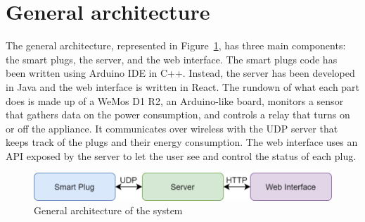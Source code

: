 \documentclass[conference]{IEEEtran}
\begin{document}
	\section{General architecture}
	The general architecture, represented in Figure~\ref{fig:architecture_schema}, has three main components: the
	smart plugs, the server, and the web interface. The smart
	plugs code has been written using Arduino IDE in C++.
	Instead, the server has been developed in Java and the web
	interface is written in React. The rundown of what each part
	does is made up of a WeMos D1 R2, an Arduino-like board,
	monitors a sensor that gathers data on the power consumption,
	and controls a relay that turns on or off the appliance. It
	communicates over wireless with the UDP server that keeps
	track of the plugs and their energy consumption. The web
	interface uses an API exposed by the server to let the user see
	and control the status of each plug.
	\begin{figure}[htbp]
		\centering
		\includegraphics[width=\linewidth]{assets/architecture_schema}
		\caption{General architecture of the system}
		\label{fig:architecture_schema}
	\end{figure}
	
\end{document}
